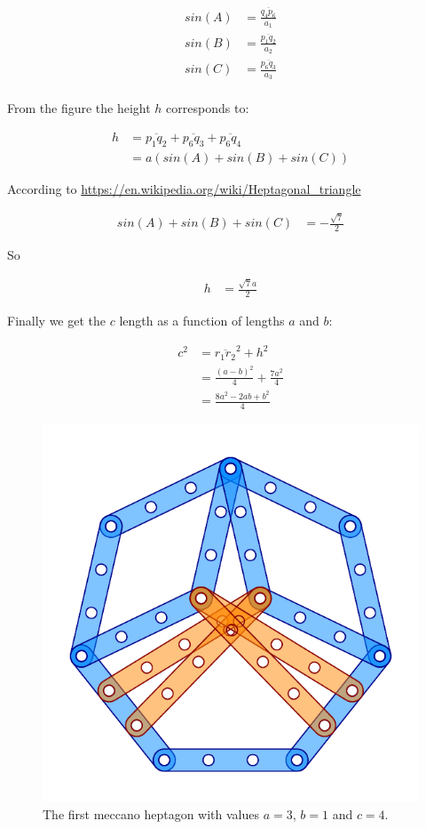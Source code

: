 \documentclass[11pt]{article}
\begin{document}
\begin{align*}
sin(A) &= \frac{\overline{q_4 p_6}}{a_1} \\
sin(B) &= \frac{\overline{p_1 q_2}}{a_2} \\
sin(C) &= \frac{\overline{p_6 q_3}}{a_3} \\
\end{align*}

From the figure the height $h$ corresponds to:

\begin{align*}
h &= \overline{p_1 q_2} + \overline{p_6 q_3} + \overline{p_6 q_4} \\
  &= a(sin(A) + sin(B) + sin(C))
\end{align*}

According to \url{https://en.wikipedia.org/wiki/Heptagonal_triangle}

\begin{align*}
sin(A) + sin(B) + sin(C) &= -\frac{\sqrt{7}}{2}
\end{align*}

So

\begin{align*}
h &= \frac{\sqrt{7}a}{2}
\end{align*}

Finally we get the $c$ length as a function of lengths $a$ and $b$:

\begin{align*}
c^2 &= \overline{r_1 r_2}^2 + h^2 \\
    &= \frac{(a - b)^2}{4} + \frac{7a^2}{4} \\
    &= \frac{8a^2 - 2ab + b^2}{4}
\end{align*}

\begin{figure}[htp]
\centering
\includegraphics[scale=1]{figs/heptagon-3}
\caption{The first meccano heptagon with values $a=3$, $b=1$ and $c=4$.}
\label{heptagon-3}
\end{figure}
\end{document}
